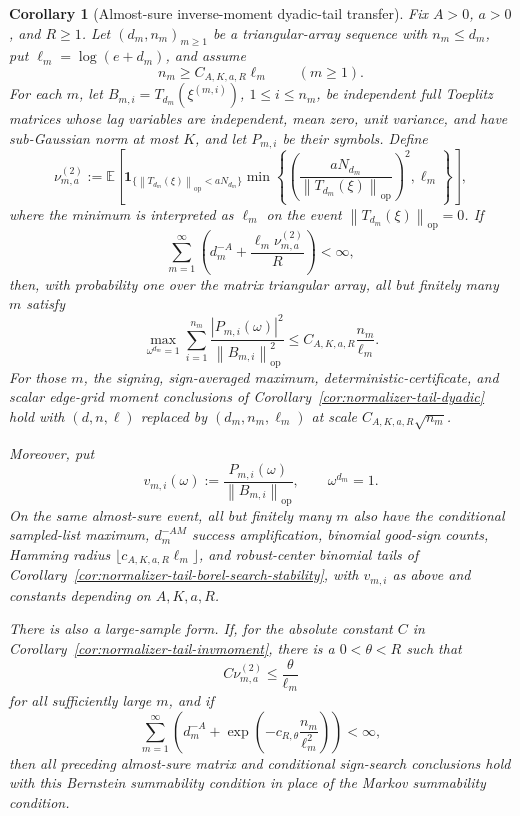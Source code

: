 \documentclass[11pt]{amsart}
\numberwithin{equation}{section}
\newtheorem{corollary}[theorem]{Corollary}
\theoremstyle{definition}
\theoremstyle{remark}
\newcommand{\op}{\mathrm{op}}
\newcommand{\Exp}{\mathbb E}
\newcommand{\norm}[1]{\left\lVert #1\right\rVert}
\newcommand{\abs}[1]{\left\lvert #1\right\rvert}
\begin{document}
\begin{corollary}[Almost-sure inverse-moment dyadic-tail transfer]
\label{cor:normalizer-tail-invmoment-borel}
Fix \(A>0\), \(a>0\), and \(R\ge1\).  Let \((d_m,n_m)_{m\ge1}\) be a
triangular-array sequence with \(n_m\le d_m\), put
\(\ell_m=\log(e+d_m)\), and assume
\[
  n_m\ge C_{A,K,a,R}\ell_m
  \qquad(m\ge1).
\]
For each \(m\), let \(B_{m,i}=T_{d_m}(\xi^{(m,i)})\),
\(1\le i\le n_m\), be independent full Toeplitz matrices whose lag variables
are independent, mean zero, unit variance, and have sub-Gaussian norm at most
\(K\), and let \(P_{m,i}\) be their symbols.  Define
\[
  \nu_{m,a}^{(2)}
  :=
  \Exp\left[
  \mathbf 1_{\{\norm{T_{d_m}(\xi)}_{\op}<aN_{d_m}\}}
  \min\left\{
  \left(\frac{aN_{d_m}}{\norm{T_{d_m}(\xi)}_{\op}}\right)^2,\ell_m
  \right\}
  \right],
\]
where the minimum is interpreted as \(\ell_m\) on the event
\(\norm{T_{d_m}(\xi)}_{\op}=0\).  If
\[
  \sum_{m=1}^{\infty}
  \left(d_m^{-A}+\frac{\ell_m\nu_{m,a}^{(2)}}{R}\right)<\infty,
\]
then, with probability one over the matrix triangular array, all but finitely
many \(m\) satisfy
\[
  \max_{\omega^{d_m}=1}
  \sum_{i=1}^{n_m}
  \frac{\abs{P_{m,i}(\omega)}^2}{\norm{B_{m,i}}_{\op}^2}
  \le C_{A,K,a,R}\frac{n_m}{\ell_m}.
\]
For those \(m\), the signing, sign-averaged maximum,
deterministic-certificate, and scalar edge-grid moment conclusions of
Corollary~\ref{cor:normalizer-tail-dyadic} hold with
\((d,n,\ell)\) replaced by \((d_m,n_m,\ell_m)\) at scale
\(C_{A,K,a,R}\sqrt{n_m}\).

Moreover, put
\[
  v_{m,i}(\omega):=
  \frac{P_{m,i}(\omega)}{\norm{B_{m,i}}_{\op}},
  \qquad \omega^{d_m}=1.
\]
On the same almost-sure event, all but finitely many \(m\) also have the
conditional sampled-list maximum, \(d_m^{-AM}\) success amplification,
binomial good-sign counts, Hamming radius \(\lfloor c_{A,K,a,R}\ell_m\rfloor\),
and robust-center binomial tails of
Corollary~\ref{cor:normalizer-tail-borel-search-stability}, with \(v_{m,i}\)
as above and constants depending on \(A,K,a,R\).

There is also a large-sample form.  If, for the absolute constant \(C\) in
Corollary~\ref{cor:normalizer-tail-invmoment}, there is a
\(0<\theta<R\) such that
\[
  C\nu_{m,a}^{(2)}\le \frac{\theta}{\ell_m}
\]
for all sufficiently large \(m\), and if
\[
  \sum_{m=1}^{\infty}
  \left(d_m^{-A}+\exp\left(-c_{R,\theta}\frac{n_m}{\ell_m^2}\right)\right)
  <\infty,
\]
then all preceding almost-sure matrix and conditional sign-search conclusions
hold with this Bernstein summability condition in place of the Markov
summability condition.


\end{corollary}
\end{document}
